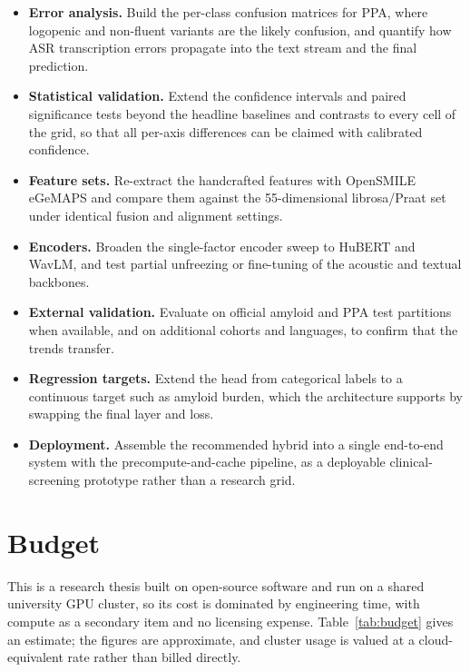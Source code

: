 \documentclass[a4paper,12pt]{article}
\begin{document}
\begin{itemize}
    \item \textbf{Error analysis.} Build the per-class confusion matrices for PPA, where logopenic and non-fluent variants are the likely confusion, and quantify how ASR transcription errors propagate into the text stream and the final prediction.
    \item \textbf{Statistical validation.} Extend the confidence intervals and paired significance tests beyond the headline baselines and contrasts to every cell of the grid, so that all per-axis differences can be claimed with calibrated confidence.
    \item \textbf{Feature sets.} Re-extract the handcrafted features with OpenSMILE eGeMAPS and compare them against the 55-dimensional librosa/Praat set under identical fusion and alignment settings.
    \item \textbf{Encoders.} Broaden the single-factor encoder sweep to HuBERT and WavLM, and test partial unfreezing or fine-tuning of the acoustic and textual backbones.
    \item \textbf{External validation.} Evaluate on official amyloid and PPA test partitions when available, and on additional cohorts and languages, to confirm that the trends transfer.
    \item \textbf{Regression targets.} Extend the head from categorical labels to a continuous target such as amyloid burden, which the architecture supports by swapping the final layer and loss.
    \item \textbf{Deployment.} Assemble the recommended hybrid into a single end-to-end system with the precompute-and-cache pipeline, as a deployable clinical-screening prototype rather than a research grid.
\end{itemize}

\clearpage

\section{Budget}

This is a research thesis built on open-source software and run on a shared university GPU cluster, so its cost is dominated by engineering time, with compute as a secondary item and no licensing expense. Table~\ref{tab:budget} gives an estimate; the figures are approximate, and cluster usage is valued at a cloud-equivalent rate rather than billed directly.
\end{document}
